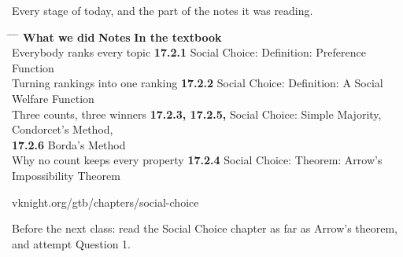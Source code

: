 \newpage
\nonotes
{}

\vspace{0.3cm}

{\large Every stage of today, and the part of the notes it was reading.}

\vspace{0.35cm}

\hspace{0.3cm}
\begin{minipage}{0.95\linewidth}
\begin{tabbing}
\hspace{6.9cm} \= \hspace{3.0cm} \= \hspace{9.4cm} \= \kill
\textbf{What we did} \> {\color{inkteal}\textbf{Notes}} \> \textbf{In the textbook} \>
  \\[0.5em]
Everybody ranks every topic \> {\color{inkteal}\textbf{17.2.1}} \> Social Choice:
  Definition: Preference Function \> \\[0.45em]
Turning rankings into one ranking \> {\color{inkteal}\textbf{17.2.2}} \> Social
  Choice: Definition: A Social Welfare Function \> \\[0.45em]
Three counts, three winners \> {\color{inkteal}\textbf{17.2.3, 17.2.5,}} \>
  Social Choice: Simple Majority, Condorcet's Method, \> \\
\> {\color{inkteal}\textbf{17.2.6}} \> Borda's Method \> \\[0.45em]
Why no count keeps every property \> {\color{inkteal}\textbf{17.2.4}} \> Social
  Choice: Theorem: Arrow's Impossibility Theorem \> 
\end{tabbing}
\end{minipage}

\vspace{0.45cm}

{\color{inkgrey} vknight.org/gtb/chapters/social-choice}

\vspace{0.3cm}

{\large Before the next class: read the Social Choice chapter as far as Arrow's
  theorem, and
  attempt Question 1.}


